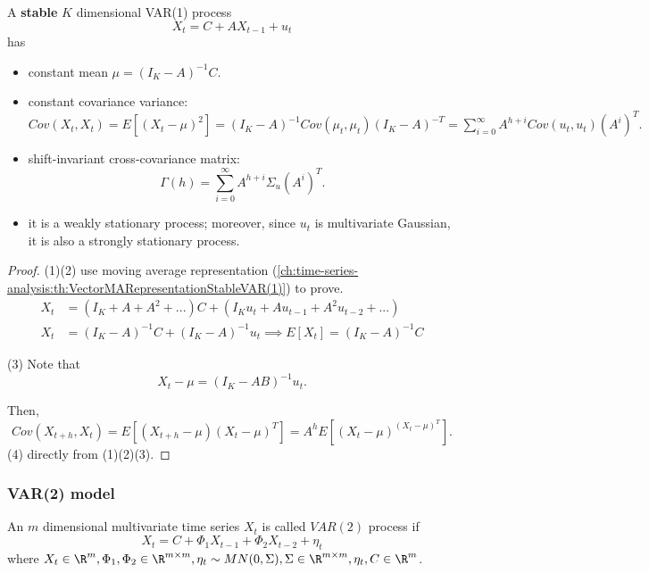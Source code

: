 \begin{lemma}\cite[16]{lutkepohl2005new}
A \textbf{stable} $K$ dimensional VAR(1) process 
$$X_t = C + A X_{t-1} + u_t$$
has
\begin{itemize}
\item constant mean $\mu = (I_K - A)^{-1}C$.
\item constant covariance variance: $Cov(X_t,X_t) = E[(X_t - \mu)^2] = (I_K - A)^{-1}Cov(\mu_t,\mu_t)(I_K - A)^{-T} = \sum_{i=0}^\infty A^{h+i} Cov(u_t,u_t) (A^i)^T.$
\item shift-invariant cross-covariance matrix: $$\Gamma(h) = \sum_{i=0}^\infty A^{h+i} \Sigma_u (A^i)^T.$$

\item it is a weakly stationary process; moreover, since $u_t$ is multivariate Gaussian, it is also a strongly stationary process. 
\end{itemize}
\end{lemma}
\begin{proof}
(1)(2) use moving average representation (\autoref{ch:time-series-analysis:th:VectorMARepresentationStableVAR(1)}) to prove. 
\begin{align*}
X_t &= (I_K + A + A^2 + ... )C + (I_Ku_t + Au_{t-1} + A^2u_{t-2} + ...) \\
X_t &= (I_K-A)^{-1}C + (I_K-A)^{-1}u_t \implies E[X_t] = (I_K-A)^{-1}C
\end{align*}

(3)
Note that
$$X_t - \mu = (I_K - AB)^{-1}u_t.$$

Then,
$$Cov(X_{t+h},X_t) = E[(X_{t+h} - \mu)(X_t - \mu)^T] = A^hE[(X_t - \mu)^(X_t - \mu)^T].$$
(4) directly from (1)(2)(3).
\end{proof}


\subsubsection{VAR(2) model}
\begin{definition}[VAR(2)]
	An $m$ dimensional multivariate time series $X_t$ is called $VAR(2)$ process if 
	$$X_t = C + \Phi_1 X_{t-1} + \Phi_2 X_{t-2} + \eta_t$$
	where $X_t\in \R^m,\Phi_1,\Phi_2 \in \R^{m\times m}, \eta_t\sim MN(0,\Sigma),\Sigma \in \R^{m\times m}, \eta_t, C \in \R^m$.
\end{definition}


